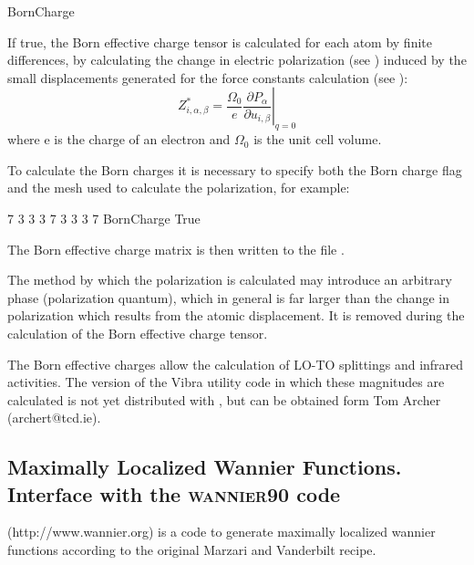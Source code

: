\begin{fdflogicalF}{BornCharge}

  If true, the Born effective charge tensor is calculated for each
  atom by finite differences, by calculating the change in electric
  polarization (see ) induced by the small
  displacements generated for the force constants calculation (see
  ):
  \begin{equation}
    \label{eq:effective_charge}
    Z^*_{i,\alpha,\beta}=\frac{\Omega_0}{e} \left. {\frac{\partial{P_\alpha}}
          {\partial{u_{i,\beta}}}}\right|_{q=0}
  \end{equation}
  where e is the charge of an electron and $\Omega_0$ is the unit cell
  volume.

  To calculate the Born charges it is necessary to specify both the
  Born charge flag and the mesh used to calculate the polarization,
  for example:
  \begin{fdfexample}
      7  3  3
      3  7  3
      3  3  7
    BornCharge True
  \end{fdfexample}

  The Born effective charge matrix is then written to the file
  .

  The method by which the polarization is calculated may introduce an
  arbitrary phase (polarization quantum), which in general is far
  larger than the change in polarization which results from the atomic
  displacement. It is removed during the calculation of the Born
  effective charge tensor.

  The Born effective charges allow the calculation of LO-TO splittings
  and infrared activities. The version of the Vibra utility code in
  which these magnitudes are calculated is not yet distributed with
  \siesta, but can be obtained form Tom Archer (archert@tcd.ie).

\end{fdflogicalF}



\subsection[Maximally Localized Wannier Functions]%
{Maximally Localized Wannier Functions. \\
    Interface with the \textsc{wannier90} code}

 (http://www.wannier.org) is a code to generate
maximally localized wannier functions according to the original
Marzari and Vanderbilt recipe.

